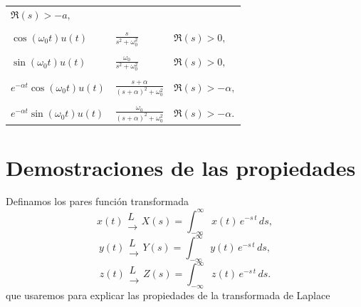 \begin{center}
\begin{tabular}{lll}
                                                       $\Re\left( s\right) >-a,$ \\ 
                        &                                               &       \\
$\cos \left( \omega _{0}t\right) u\left( t\right) $ & $\frac{s}{s^{2}+\omega _{0}^{2}}$ & 
                                                       $\Re\left( s\right) >0,$ \\ 
                        &                                               &       \\
$\sin \left( \omega _{0}t\right) u\left( t\right) $ & $\frac{\omega _{0}}{s^{2}+\omega _{0}^{2}}$ & 
                                                       $\Re\left( s\right) >0,$ \\ 
                        &                                               &       \\
$e^{-\alpha t}\cos \left( \omega _{0}t\right) u\left( t\right) $ & 
                       $\frac{s+\alpha }{\left( s+\alpha \right) ^{2}+\omega _{0}^{2}}$ & 
                                                       $\Re\left(s\right) >-\alpha ,$ \\ 
                        &                                               &       \\
$e^{-\alpha t}\sin \left( \omega _{0}t\right) u\left( t\right) $ & 
      $\frac{\omega _{0}}{\left( s+\alpha \right) ^{2}+\omega _{0}^{2}}$ & 
              $\Re\left( s\right) >-\alpha$.
\end{tabular}
\end{center}

\section{Demostraciones de las propiedades}

Definamos los pares funci\'{o}n transformada
\begin{equation}
x(t) \begin{array}{c} L \\ \rightarrow \end{array} X(s) = \int_{-\infty}^{\infty} x(t) \, e^{-s \, t} \, ds, \label{x.trans.laplace}
\end{equation}
\begin{equation}
y(t) \begin{array}{c} L \\ \rightarrow \end{array} Y(s) = \int_{-\infty}^{\infty} y(t) \, e^{-s \, t} \, ds, \label{y.trans.laplace}
\end{equation}
\begin{equation}
z(t) \begin{array}{c} L \\ \rightarrow \end{array} Z(s) = \int_{-\infty}^{\infty} z(t) \, e^{-s \, t} \, ds. \label{z.trans.laplace}
\end{equation}
que usaremos para explicar las propiedades de la transformada de Laplace

